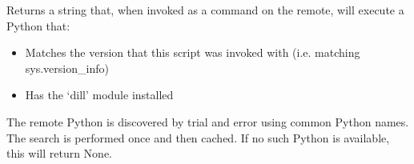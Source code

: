 \documentclass[letterpaper,12pt,english]{sphinxmanual}
\begin{document}
\begin{fulllineitems}
\begin{fulllineitems}
\end{fulllineitems}


\begin{fulllineitems}
\label{\detokenize{PARyOpt.evaluators:PARyOpt.evaluators.connection.Connection.remote_python}}
\sphinxAtStartPar
Returns a string that, when invoked as a command on the remote, will execute a Python that:
\begin{itemize}
\item {} 
\sphinxAtStartPar
Matches the version that this script was invoked with (i.e. matching sys.version\_info)

\item {} 
\sphinxAtStartPar
Has the ‘dill’ module installed

\end{itemize}

\sphinxAtStartPar
The remote Python is discovered by trial and error using common Python names.
The search is performed once and then cached.
If no such Python is available, this will return None.

\end{fulllineitems}


\begin{fulllineitems}
\label{\detokenize{PARyOpt.evaluators:PARyOpt.evaluators.connection.Connection.sftp}}
\end{fulllineitems}


\end{fulllineitems}

\end{document}
